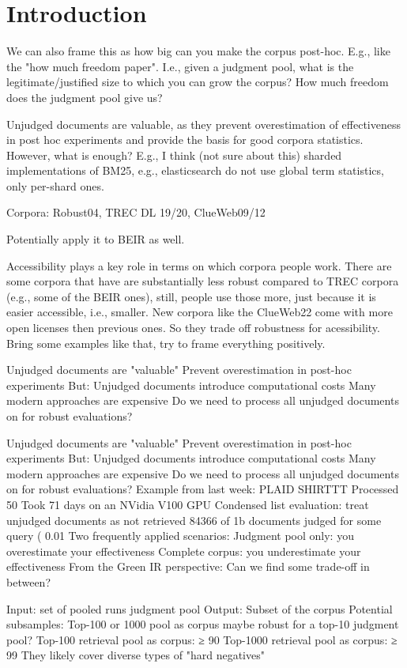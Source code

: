 \section{Introduction}

We can also frame this as how big can you make the corpus post-hoc. E.g., like the "how much freedom paper". I.e., given a judgment pool, what is the legitimate/justified size to which you can grow the corpus? How much freedom does the judgment pool give us?

Unjudged documents are valuable, as they prevent overestimation of effectiveness in post hoc experiments and provide the basis for good corpora statistics. However, what is enough? E.g., I think (not sure about this) sharded implementations of BM25, e.g., elasticsearch do not use global term statistics, only per-shard ones.

Corpora: Robust04, TREC DL 19/20, ClueWeb09/12

Potentially apply it to BEIR as well.


Accessibility plays a key role in terms on which corpora people work. There are some corpora that have are substantially less robust compared to TREC corpora (e.g., some of the BEIR ones), still, people use those more, just because it is easier accessible, i.e., smaller. New corpora like the ClueWeb22 come with more open licenses then previous ones. So they trade off robustness for acessibility. Bring some examples like that, try to frame everything positively.


Unjudged documents are "valuable"
Prevent overestimation in post-hoc experiments
But: Unjudged documents introduce computational costs
Many modern approaches are expensive
Do we need to process all unjudged documents on for robust evaluations?




Unjudged documents are "valuable"
Prevent overestimation in post-hoc experiments
But: Unjudged documents introduce computational costs
Many modern approaches are expensive
Do we need to process all unjudged documents on for robust evaluations?
Example from last week: PLAID SHIRTTT
Processed 50%
Took 71 days on an NVidia V100 GPU
Condensed list evaluation: treat unjudged documents as not retrieved
84366 of 1b documents judged for some query ( 0.01%
Two frequently applied scenarios:
Judgment pool only: you overestimate your effectiveness
Complete corpus: you underestimate your effectiveness
From the Green IR perspective: Can we find some trade-off in between?


Input:
set of pooled runs
judgment pool
Output:
Subset of the corpus
Potential subsamples:
Top-100 or 1000 pool as corpus maybe robust for a top-10 judgment pool?
Top-100 retrieval pool as corpus: ≥ 90%
Top-1000 retrieval pool as corpus: ≥ 99%
They likely cover diverse types of "hard negatives"
